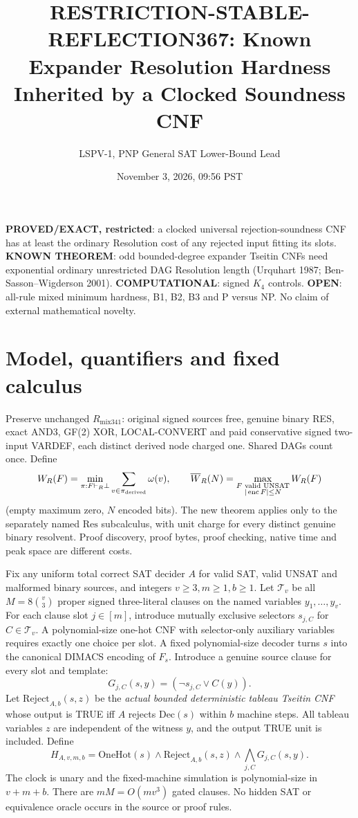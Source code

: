 \documentclass[11pt]{article}
\title{RESTRICTION-STABLE-REFLECTION367: Known Expander Resolution Hardness Inherited by a Clocked Soundness CNF}
\author{LSPV-1, PNP General SAT Lower-Bound Lead}
\date{November 3, 2026, 09:56 PST}
\begin{document}
\maketitle
\noindent\textbf{PROVED/EXACT, restricted}: a clocked universal rejection-soundness CNF has at least the ordinary Resolution cost of any rejected input fitting its slots. \textbf{KNOWN THEOREM}: odd bounded-degree expander Tseitin CNFs need exponential ordinary unrestricted DAG Resolution length (Urquhart 1987; Ben-Sasson--Wigderson 2001). \textbf{COMPUTATIONAL}: signed \(K_4\) controls. \textbf{OPEN}: all-rule mixed minimum hardness, B1, B2, B3 and P versus NP. No claim of external mathematical novelty.

\section*{Model, quantifiers and fixed calculus}
Preserve unchanged \(R_{\mathrm{mix341}}\): original signed sources free, genuine binary RES, exact AND3, GF(2) XOR, LOCAL-CONVERT and paid conservative signed two-input VARDEF, each distinct derived node charged one. Shared DAGs count once. Define
\[
W_R(F)=\min_{\pi:F\vdash_R\bot}\sum_{v\in\pi_{\rm derived}}\omega(v),\qquad
\overline W_R(N)=\max_{\substack{F\text{ valid UNSAT}\\|\operatorname{enc}F|\le N}}W_R(F)
\]
(empty maximum zero, \(N\) encoded bits). The new theorem applies only to the separately named \(\mathrm{Res}\) subcalculus, with unit charge for every distinct genuine binary resolvent. Proof discovery, proof bytes, proof checking, native time and peak space are different costs.

Fix any uniform total correct SAT decider \(A\) for valid SAT, valid UNSAT and malformed binary sources, and integers \(v\ge3,m\ge1,b\ge1\). Let \(\mathcal T_v\) be all \(M=8\binom v3\) proper signed three-literal clauses on the named variables \(y_1,\dots,y_v\). For each clause slot \(j\in[m]\), introduce mutually exclusive selectors \(s_{j,C}\) for \(C\in\mathcal T_v\). A polynomial-size one-hot CNF with selector-only auxiliary variables requires exactly one choice per slot. A fixed polynomial-size decoder turns \(s\) into the canonical DIMACS encoding of \(F_s\). Introduce a genuine source clause for every slot and template:
\[
G_{j,C}(s,y)=(\neg s_{j,C}\lor C(y)).
\]
Let \(\mathrm{Reject}_{A,b}(s,z)\) be the \emph{actual bounded deterministic tableau Tseitin CNF} whose output is TRUE iff \(A\) rejects \(\mathrm{Dec}(s)\) within \(b\) machine steps. All tableau variables \(z\) are independent of the witness \(y\), and the output TRUE unit is included. Define
\[
H_{A,v,m,b}=\mathrm{OneHot}(s)\land\mathrm{Reject}_{A,b}(s,z)\land
\bigwedge_{j,C}G_{j,C}(s,y). \tag{1}
\]
The clock is unary and the fixed-machine simulation is polynomial-size in \(v+m+b\). There are \(mM=O(mv^3)\) gated clauses. No hidden SAT or equivalence oracle occurs in the source or proof rules.
\end{document}
